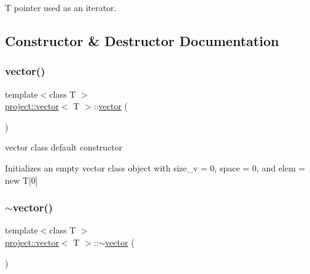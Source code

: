T pointer used as an iterator. 

\subsection{Constructor \& Destructor Documentation}
\mbox{\label{classproject_1_1vector_ae194dee52fe56d5fe6625021aad2d63d}} 
\subsubsection{\texorpdfstring{vector()}{vector()}\hspace{0.1cm}{\footnotesize\ttfamily [1/4]}}
{\footnotesize\ttfamily template$<$class T $>$ \\
\mbox{\hyperlink{classproject_1_1vector}{project\+::vector}}$<$ T $>$\+::\mbox{\hyperlink{classproject_1_1vector}{vector}} (\begin{DoxyParamCaption}{ }\end{DoxyParamCaption})\hspace{0.3cm}{\ttfamily [inline]}}



vector class default constructor 

Initializes an empty vector class object with size\+\_\+v = 0, space = 0, and elem = new T\mbox{[}0\mbox{]} \mbox{\label{classproject_1_1vector_a7abf9e5bf13e90184fe454e468e282d4}} 
\subsubsection{\texorpdfstring{$\sim$vector()}{~vector()}}
{\footnotesize\ttfamily template$<$class T $>$ \\
\mbox{\hyperlink{classproject_1_1vector}{project\+::vector}}$<$ T $>$\+::$\sim$\mbox{\hyperlink{classproject_1_1vector}{vector}} (\begin{DoxyParamCaption}{ }\end{DoxyParamCaption})\hspace{0.3cm}{\ttfamily [inline]}}



